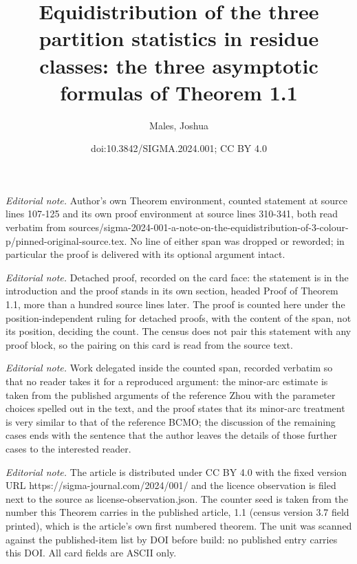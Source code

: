 \documentclass[10pt,a4paper]{amsart}
\title{Equidistribution of the three partition statistics in residue classes: the three asymptotic formulas of Theorem 1.1}
\author{Males, Joshua}
\date{doi:10.3842/SIGMA.2024.001; CC BY 4.0}
\numberwithin{equation}{section}
\begin{document}
\maketitle
\setcounter{section}{1}
\setcounter{Theorem}{0}
\noindent\textit{Editorial note.} Author's own Theorem environment, counted statement at source lines 107-125 and its own proof environment at source lines 310-341, both read verbatim from sources/sigma-2024-001-a-note-on-the-equidistribution-of-3-colour-p/pinned-original-source.tex. No line of either span was dropped or reworded; in particular the proof is delivered with its optional argument intact.\par\medskip
\noindent\textit{Editorial note.} Detached proof, recorded on the card face: the statement is in the introduction and the proof stands in its own section, headed Proof of Theorem 1.1, more than a hundred source lines later. The proof is counted here under the position-independent ruling for detached proofs, with the content of the span, not its position, deciding the count. The census does not pair this statement with any proof block, so the pairing on this card is read from the source text.\par\medskip
\noindent\textit{Editorial note.} Work delegated inside the counted span, recorded verbatim so that no reader takes it for a reproduced argument: the minor-arc estimate is taken from the published arguments of the reference Zhou with the parameter choices spelled out in the text, and the proof states that its minor-arc treatment is very similar to that of the reference BCMO; the discussion of the remaining cases ends with the sentence that the author leaves the details of those further cases to the interested reader.\par\medskip
\noindent\textit{Editorial note.} The article is distributed under CC BY 4.0 with the fixed version URL https://sigma-journal.com/2024/001/ and the licence observation is filed next to the source as license-observation.json. The counter seed is taken from the number this Theorem carries in the published article, 1.1 (census version 3.7 field printed), which is the article's own first numbered theorem. The unit was scanned against the published-item list by DOI before build: no published entry carries this DOI. All card fields are ASCII only.\par\medskip
\end{document}
